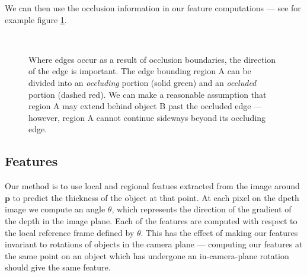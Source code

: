 \documentclass[10pt,twocolumn,letterpaper]{article}
\newcommand{\point}{\mathbf{p}}
\begin{document}
We can then use the occlusion information in our feature computations --- see for example figure \ref{fig:occluded_region}.


\begin{figure}
    \centering 
        \hfill
     \\
    \caption{Where edges occur as a result of occlusion boundaries, the direction of the edge is important. The edge bounding region A can be divided into an \emph{occluding} portion (solid green) and an \emph{occluded} portion (dashed red).
    We can make a reasonable assumption that region A may extend behind object B past the occluded edge --- however, region A cannot continue sideways beyond its occluding edge.}
    \label{fig:occluded_region}
\end{figure}



\subsection{Features}
Our method is to use local and regional featues extracted from the image around $\point$ to predict the thickness of the object at that point.
At each pixel on the dpeth image we compute an angle $\theta$, which represents the direction of the gradient of the depth in the image plane.
Each of the features are computed with respect to the local reference frame defined by $\theta$.
This has the effect of making our features invariant to rotations of objects in the camera plane --- computing our features at the same point on an object which has undergone an in-camera-plane rotation should give the same feature.
\end{document}
